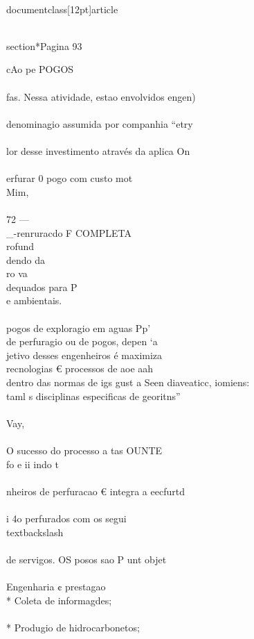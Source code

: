 \\documentclass[12pt]{article}
\begin{document}
{\\section*{Pagina 93}

cAo pe POGOS\\
\\
fas. Nessa atividade, estao envolvidos engen)\\
\\
denominagio assumida por companhia “etry\\
\\
lor desse investimento através da aplica On\\
\\
erfurar 0 pogo com custo mot\\
Mim,\\
\\
72 —\\_-renruracdo F COMPLETA\\
rofund\\
dendo da\\
ro va\\
dequados para P\\
e ambientais.\\
\\
pogos de exploragio em aguas Pp’\\
de perfuragio ou de pogos, depen ‘a\\
jetivo desses engenheiros é maximiza\\
recnologias € processos de aoe aah\\
dentro das normas de igs gust a Seen diaveaticc, iomiens:\\
taml s disciplinas especificas de georitns”\\
\\
Vay,\\
\\
O sucesso do processo a tas OUNTE\\
fo e ii indo t\\
\\
nheiros de perfuracao € integra a eecfurtd\\
\\
i 4o perfurados com os segui \\textbackslash{}\\
\\
de servigos. OS posos sao P unt objet\\
\\
Engenharia ¢ prestagao\\
* Coleta de informagdes;\\
\\
* Produgio de hidrocarbonetos;\\
}
\end{document}
